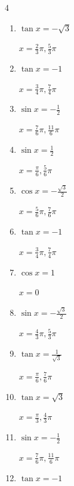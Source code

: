 \begin{multicols}{4}
\begin{enumerate}
  \item $\displaystyle \tan{x}  = -\sqrt{3}$

        $\displaystyle x = \frac{2}{3}\pi , \frac{5}{3}\pi$

  \item $\displaystyle \tan{x}  = -1$

        $\displaystyle x = \frac{3}{4}\pi , \frac{7}{4}\pi$

\columnbreak %

  \item $\displaystyle \sin{x}  = -\frac{1}{2}$

        $\displaystyle x = \frac{7}{6}\pi , \frac{11}{6}\pi$

  \item $\displaystyle \sin{x}  = \frac{1}{2}$

        $\displaystyle x = \frac{\pi}{6} , \frac{5}{6}\pi$

  \item $\displaystyle \cos{x}  = -\frac{\sqrt{3}}{2}$

        $\displaystyle x = \frac{5}{6}\pi , \frac{7}{6}\pi$

  \item $\displaystyle \tan{x}  = -1$

        $\displaystyle x = \frac{3}{4}\pi , \frac{7}{4}\pi$

  \item $\displaystyle \cos{x}  = 1$

        $\displaystyle x = 0$

  \item $\displaystyle \sin{x}  = -\frac{\sqrt{3}}{2}$

        $\displaystyle x = \frac{4}{3}\pi , \frac{5}{3}\pi$

  \item $\displaystyle \tan{x}  = \frac{1}{\sqrt{3}}$

        $\displaystyle x = \frac{\pi}{6} , \frac{7}{6}\pi$

  \item $\displaystyle \tan{x}  = \sqrt{3}$

        $\displaystyle x = \frac{\pi}{3} , \frac{4}{3}\pi$

  \item $\displaystyle \sin{x}  = -\frac{1}{2}$

        $\displaystyle x = \frac{7}{6}\pi , \frac{11}{6}\pi$

  \item $\displaystyle \tan{x}  = -1$


\end{enumerate}
\end{multicols}
